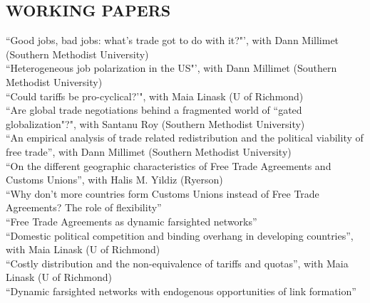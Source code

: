 \documentclass[11pt]{res}
\begin{document}
\begin{resume}
\section{WORKING PAPERS}\vspace{1.5mm}
{``Good jobs, bad jobs: what's trade got to do with it?"'}, with Dann Millimet (Southern Methodist University)\vspace{1.5mm}\\
{``Heterogeneous job polarization in the US"'}, with Dann Millimet (Southern Methodist University)\vspace{1.5mm}\\
{``Could tariffs be pro-cyclical?'"}, with Maia Linask (U of Richmond)\vspace{1.5mm}\\
{``Are global trade negotiations behind a fragmented world of ``gated globalization"?"}, with Santanu Roy (Southern Methodist University)\vspace{1.5mm}\\
{``An empirical analysis of trade related redistribution and the political viability of free trade''}, with Dann Millimet (Southern Methodist University)\vspace{1.5mm}\\
{``On the different geographic characteristics of Free Trade Agreements and Customs Unions''}, with Halis M. Yildiz (Ryerson)\vspace{1.5mm}\\
{``Why don't more countries form Customs Unions instead of Free Trade Agreements? The role of flexibility''} \vspace{1.5mm}\\


\phantom{.}\vspace{.05cm}
{ ``Free Trade Agreements as dynamic farsighted networks''} \vspace{1.5mm}\\
{``Domestic political competition and binding overhang in developing countries''}, with Maia Linask (U of Richmond)\vspace{1.5mm}\\
{``Costly distribution and the non-equivalence of tariffs and quotas''}, with Maia Linask (U of Richmond)\vspace{1.5mm}\\
{ ``Dynamic farsighted networks with endogenous opportunities of link formation''} \vspace{1.5mm}\\


\end{resume}
\end{document}
